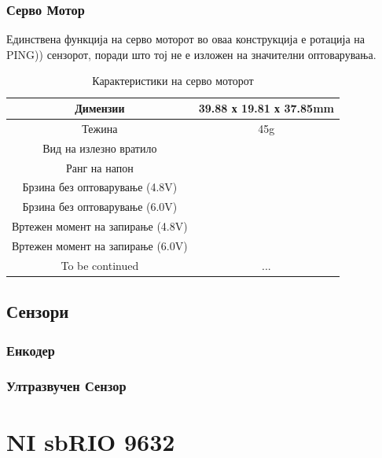 \documentclass{article}
\begin{document}
\subsubsection{Серво Мотор}

Единствена функција на серво моторот во оваа конструкција е ротација на PING)) сензорот, поради што тој не е изложен на значителни оптоварувања.

\begin{table}[h]
\caption{Карактеристики на серво моторот}
\label{tab:title}

\begin{center}
\begin{tabular}{||c|c||}
\hline
Димензии  & 39.88 х 19.81 х 37.85mm \\ [0.75ex]
\hline
Тежина & 45g \\
\hline 
Вид на излезно вратило &  \\
\hline
Ранг на напон &  \\
\hline
Брзина без оптоварување (4.8V) &  \\
\hline
Брзина без оптоварување (6.0V) &  \\
\hline
Вртежен момент на запирање (4.8V) &  \\ 
\hline
Вртежен момент на запирање (6.0V) &  \\ [0.5ex]
\hline
To be continued & ... \\
\hline
\end{tabular}
\end{center}
\end{table}


\subsection{Сензори}
\subsubsection{Енкодер}
\subsubsection{Ултразвучен Сензор}
\newpage
\section{NI sbRIO 9632}
\end{document}
